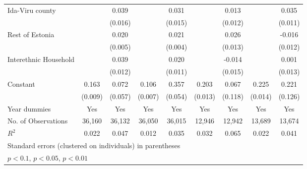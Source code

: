 \begin{sidewaystable}
\begin{tabular}{l*{2}{c}| *{2}{c}| *{2}{c}| *{2}{c}}
Ida-Viru county           &                     &       0.039\sym{**} &                     &       0.031\sym{**} &                     &       0.013         &                     &       0.035\sym{***}\\
&                     &     (0.016)         &                     &     (0.015)         &                     &     (0.012)         &                     &     (0.011)         \\
Rest of Estonia                &                     &       0.020\sym{***}&                     &       0.021\sym{***}&                     &       0.026\sym{*}  &                     &      -0.016         \\
&                     &     (0.005)         &                     &     (0.004)         &                     &     (0.013)         &                     &     (0.012)         \\
Interethnic Household&                     &       0.039\sym{***}&                     &       0.020\sym{*}  &                     &      -0.014         &                     &       0.001         \\
&                     &     (0.012)         &                     &     (0.011)         &                     &     (0.015)         &                     &     (0.013)         \\

Constant            &       0.163\sym{***}&       0.072         &       0.106\sym{***}&       0.357\sym{***}&       0.203\sym{***}&       0.067         &       0.225\sym{***}&       0.221\sym{*}  \\
&     (0.009)         &     (0.057)         &     (0.007)         &     (0.054)         &     (0.013)         &     (0.118)         &     (0.014)         &     (0.126)         \\
	Year dummies        &         Yes         &         Yes         &         Yes         &         Yes         &         Yes         &         Yes         &         Yes         &         Yes         \\
	\midrule
No. of	Observations        &       36,160         &       36,132         &       36,050         &       36,015         &       12,946         &       12,942         &       13,689         &       13,674         \\
	 \(R^{2}\)  &       0.022         &       0.047         &       0.012         &       0.035         &       0.032         &       0.065         &       0.022         &       0.041         \\
	\bottomrule
	\multicolumn{9}{l}{\footnotesize Standard errors (clustered on individuals) in parentheses}\\
	\multicolumn{9}{l}{\footnotesize \sym{*} \(p<0.1\), \sym{**} \(p<0.05\), \sym{***} \(p<0.01\)}
\end{tabular}
\end{sidewaystable}
\clearpage

